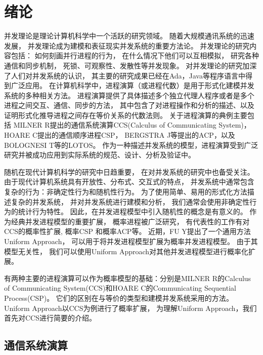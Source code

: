 
\chapter{绪论}\label{ch:intro}

并发理论是理论计算机科学中一个活跃的研究领域。
  随着大规模通讯系统的迅速发展，
  并发理论成为建模和表征现实并发系统的重要方法论。
  并发理论的研究内容包括：
  如何刻画并行进程的行为，
  在什么情况下他们可以互相模拟，
  研究各种通信和同步机制，
  死锁、可观察性、发散性等并发现象。
  对并发理论的研究加深了人们对并发系统的认识，
  其主要的研究成果已经在Ada，Java等程序语言中得到广泛应用\cite{计算机科学技术百科全书}。
  在计算机科学中，进程演算（或进程代数）是用于形式化建模并发系统的多种相关方法。
  进程演算提供了具体描述多个独立代理人程序或者是多个进程之间交互、通信、同步的方法，
  其中包含了对进程操作和分析的描述、以及证明形式化推导进程之间存在等价关系的代数法则\cite{History}。
  关于进程演算的典例主要包括
  MILNER R提出的通信系统演算CCS(Calculus of Communicating System)\cite{Milner_CCS}，
   HOARE C提出的通信顺序进程CSP\cite{Hoare_CSP}，
   BERGSTRA J等提出的ACP\cite{BERGSTRA_ACP}，以及BOLOGNESI T等的LOTOS\cite{LOTOS}。%
   作为一种描述并发系统的模型，进程演算受到广泛研究并被成功应用到实际系统的规范、设计、分析及验证中。

随机在现代计算机科学的研究中日趋重要，
在对并发系统的研究中也备受关注。
由于现代计算机系统具有开放性、分布式、交互式的特点，
并发系统中通常包含复杂的行为：非确定性行为和随机性行为。
为了使用简单、易用的形式化方法描述复杂的并发系统，
并对并发系统进行建模和分析，
我们通常会使用非确定性行为的统计行为特性。
因此，在并发进程模型中引入随机性的概念是有意义的。
作为经典并发进程模型的重要扩展，
概率进程被广泛研究，
有代表性的工作有对CCS的概率性扩展\cite{CCS_Prob_1,CCS_Prob_2},
概率CSP\cite{CSP_Prob} 和概率ACP\cite{ACP_Prob}等。
近期，FU Y提出了一个通用方法Uniform Approach\cite{Fu_UniformApproach}，
可以用于将并发进程模型扩展为概率并发进程模型。
由于其模型无关性，
我们可以使用Uniform Approach对其他并发进程模型进行概率化扩展。

有两种主要的进程演算可以作为概率模型的基础：分别是MILNER R的Calculus of Communicating System(CCS)\cite{Milner_CCS}和HOARE C的Communicating Sequential Process(CSP)\cite{Hoare_CSP}。
它们的区别在与等价的类型和建模并发系统采用的方法\cite{DIFF_CCS_CSP}。
Uniform Approach以CCS为例进行了概率扩展，
为理解Uniform Approach，我们首先对CCS进行简要的介绍。

\section{通信系统演算}

